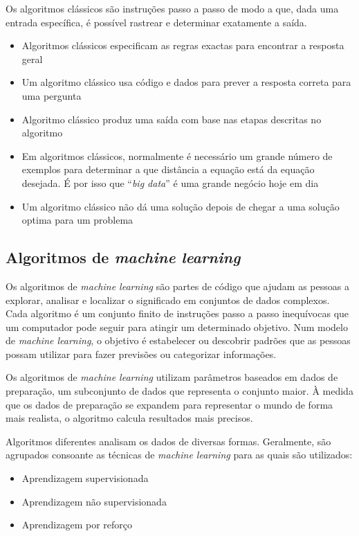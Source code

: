 \documentclass[a4paper,10pt]{article}
\begin{document}
Os algoritmos clássicos são instruções passo a passo de modo a que, dada uma entrada específica, é possível rastrear e determinar exatamente a saída.
\begin{itemize}
    \item Algoritmos clássicos especificam as regras exactas para encontrar a resposta geral
    \item Um algoritmo clássico usa código e dados para prever a resposta correta para uma pergunta
    \item Algoritmo clássico produz uma saída com base nas etapas descritas no algoritmo
    \item Em algoritmos clássicos, normalmente é necessário um grande número de exemplos para determinar a que distância a equação está da equação desejada. É por isso que ``\textit{big data}'' é uma grande negócio hoje em dia
    \item Um algoritmo clássico não dá uma solução depois de chegar a uma solução optima para um problema
\end{itemize}

\subsection{Algoritmos de \textit{machine learning}}

Os algoritmos de \textit{machine learning} são partes de código que ajudam as pessoas a explorar, analisar e localizar o significado em conjuntos de dados complexos.
Cada algoritmo é um conjunto finito de instruções passo a passo inequívocas que um computador pode seguir para atingir um determinado objetivo.
Num modelo de \textit{machine learning}, o objetivo é estabelecer ou descobrir padrões que as pessoas possam utilizar para fazer previsões ou categorizar informações.

Os algoritmos de \textit{machine learning} utilizam parâmetros baseados em dados de preparação, um subconjunto de dados que representa o conjunto maior.
À medida que os dados de preparação se expandem para representar o mundo de forma mais realista, o algoritmo calcula resultados mais precisos.

Algoritmos diferentes analisam os dados de diversas formas.
Geralmente, são agrupados consoante as técnicas de \textit{machine learning} para as quais são utilizados:
\begin{itemize}
    \item Aprendizagem supervisionada
    \item Aprendizagem não supervisionada
    \item Aprendizagem por reforço
\end{itemize}
\end{document}
